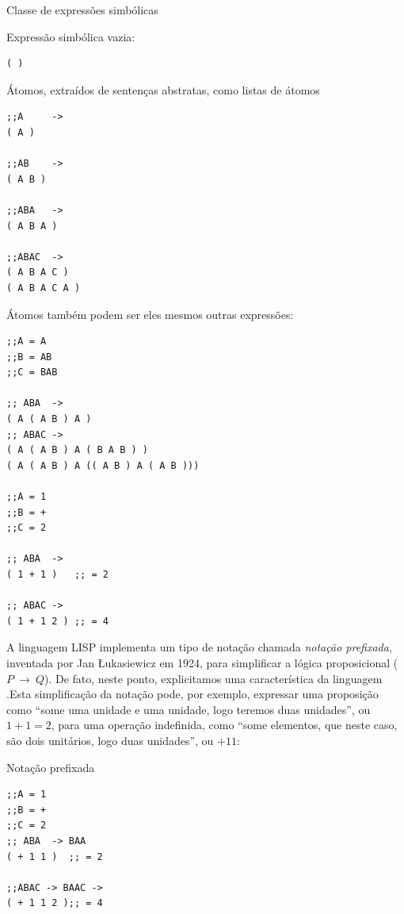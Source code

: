 \begin{example}{Classe de expressões simbólicas}\label{ex:s-expression}

Expressão simbólica vazia:

\begin{verbatim}
( )
\end{verbatim}

Átomos, extraídos de sentenças abstratas, como listas de átomos

\begin{verbatim}
;;A     -> 
( A )

;;AB    -> 
( A B )

;;ABA   ->
( A B A )

;;ABAC  ->
( A B A C )
( A B A C A )
\end{verbatim}

Átomos também podem ser eles mesmos outras expressões:

\begin{verbatim}
;;A = A
;;B = AB
;;C = BAB

;; ABA  -> 
( A ( A B ) A )
;; ABAC ->
( A ( A B ) A ( B A B ) )
( A ( A B ) A (( A B ) A ( A B )))

;;A = 1
;;B = +
;;C = 2

;; ABA  -> 
( 1 + 1 )   ;; = 2

;; ABAC -> 
( 1 + 1 2 ) ;; = 4
\end{verbatim}
\end{example}

A linguagem LISP implementa um tipo de notação chamada \emph{notação prefixada}, inventada por Jan Łukasiewicz em 1924, para simplificar a lógica proposicional ($P~\to~Q$). De fato, neste ponto, explicitamos uma característica da linguagem .Esta simplificação da notação pode, por exemplo, expressar uma proposição como  ``some uma unidade e uma unidade, logo teremos duas unidades'',  ou $1+1=2$, para uma operação indefinida, como ``some elementos, que neste caso, são dois unitários, logo duas unidades'', ou $+ 1 1$:

\begin{example}{Notação prefixada}
\begin{verbatim}
;;A = 1
;;B = +
;;C = 2
;; ABA  -> BAA
( + 1 1 )  ;; = 2

;;ABAC -> BAAC -> 
( + 1 1 2 );; = 4
\end{verbatim}
\end{example}

